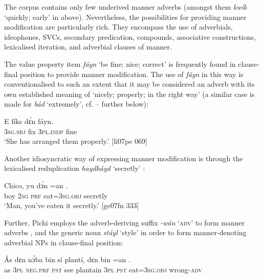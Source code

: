 The corpus contains only few underived manner adverbs (amongst them \textit{kwík} ‘quickly; early’ in  above). Nevertheless, the possibilities for providing manner modification are particularly rich. They encompass the use of adverbials, ideophones, SVCs, secondary predication, compounds, associative constructions, lexicalised iteration, and adverbial clauses of manner. 


The value property item \textit{fáyn} ‘be fine; nice; correct’ is frequently found in clause-final position to provide manner modification. The use of \textit{fáyn} in this way is conventionalised to such an extent that it may be considered an adverb with its own established meaning of ‘nicely; properly; in the right way’ (a similar case is made for \textit{bád} ‘extremely’, cf. – further below):



\ea%
    \label{ex:key:877}
    \gll E    fíks  dɛ́n    fáyn.\\
\textsc{3sg.sbj}  fix  \textsc{3pl.indp}  fine\\

\glt ‘She has arranged them properly.’ [li07pe 069]
\z

Another idiosyncratic way of expressing manner modification is through the lexicalised reduplication \textit{haydháyd} ‘secretly’ :


\ea%
    \label{ex:key:878}
    \gll Chico,  yu  dɔ́n  =an    .\\
boy    \textsc{2sg}  \textsc{prf}  eat=\textsc{3sg.obj}  secretly\\

\glt ‘Man, you’ve eaten it secretly.’ [ge07fn 333]
\z

Further, Pichi employs the adverb-deriving suffix \textit{{}-wán} \textsc{‘adv’} to form manner adverbs , and the generic noun \textit{stáyl} ‘style’  in order to form manner-denoting adverbial NPs in clause-final position:


\ea%
    \label{ex:key:879}
    \gll \'{A}s  dɛn  nɔ́ba  bin  sí  plantí,  dɛn  bin  =an    .\\
as  \textsc{3pl}  \textsc{neg.prf}  \textsc{pst}  see  plantain  \textsc{3pl}  \textsc{pst}  eat=\textsc{3sg.obj}  wrong-\textsc{adv}\\

